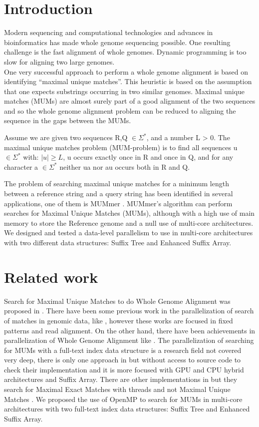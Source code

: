 \documentclass[runningheads,a4paper]{llncs}
\begin{document}
\section{Introduction} 
Modern sequencing and computational technologies and advances in bioinformatics has made whole genome sequencing possible. One resulting challenge is the fast alignment of whole genomes. Dynamic programming is too slow for aligning two large genomes.\\
One very successful approach to perform a whole genome alignment is based on identifying ``maximal unique matches''. This heuristic is based on the assumption that one expects substrings occurring in two similar genomes. Maximal unique matches (MUMs) are almost surely part of a good alignment of the two sequences and so the whole genome alignment problem can be reduced to aligning the sequence in the gaps between the MUMs.
\begin{definition}
Assume we are given two sequences R,Q $\in \Sigma^*$, and a number L > 0. The maximal unique matches problem (MUM-problem) is to find all sequences u $\in \Sigma^*$ with: $|u|\geq L$, u occurs exactly once in R and once in Q, and for any character a $\in \Sigma^*$ neither ua nor au occurs both in R and Q.
\end{definition}
The problem of searching maximal unique matches for a minimum length between a reference string and a query string has been identified in several applications, one of them is MUMmer \cite{Delcher2003}. MUMmer's algorithm can perform searches for Maximal Unique Matches (MUMs), although with a high use of main memory to store the Reference genome and a null use of multi-core architectures.\\
We designed and tested a data-level parallelism to use in multi-core architectures with two different data structures: Suffix Tree and Enhanced Suffix Array.
\section{Related work}
Search for Maximal Unique Matches to do Whole Genome Alignment was proposed in \cite{Delcher1999}. There have been some previous work in the parallelization of search of matches in genomic data, like \cite{OguzhanKulekci2011,Mongelli,Kouzinopoulos2005}, however these works are focused in fixed patterns and read alignment. On the other hand, there have been achievements in parallelization of Whole Genome Alignment like \cite{Meng2005}. The parallelization of searching for MUMs with a full-text index data structure is a research field not covered very deep, there is only one approach in \cite{Encarnac2011} but without access to source code to check their implementation and it is more focused with GPU and CPU hybrid architectures and Suffix Array. There are other implementations in \cite{Vyverman2013,OguzhanKulekci2011,Khan2009,OhlebuschGK10} but they search for Maximal Exact Matches with threads and not Maximal Unique Matches . We proposed the use of OpenMP to search for MUMs in multi-core architectures with two full-text index data structures: Suffix Tree and Enhanced Suffix Array.
\end{document}
